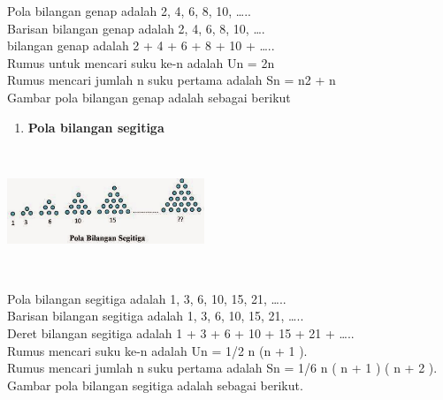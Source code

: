 \documentclass[11pt,fleqn]{book} %
\begin{document}
\noindent
\noindent Pola bilangan genap adalah 2, 4, 6, 8, 10, …..\\
\noindent Barisan bilangan genap adalah 2, 4, 6, 8, 10, ….\\
\noindent bilangan genap adalah 2 + 4 + 6 + 8 + 10 + …..\\
\noindent Rumus untuk mencari suku ke-n adalah Un = 2n\\
\noindent Rumus mencari jumlah n suku pertama adalah Sn = n2 + n\\
\noindent Gambar pola bilangan genap adalah sebagai berikut\\
\begin{enumerate}
	\item  \textbf{  Pola bilangan segitiga}
\end{enumerate}
\noindent
\begin{center}
	\noindent \includegraphics*[width=2.32in, height=1.48in, keepaspectratio=false, trim=0.00in 0.11in 0.00in 0.00in]{Pictures/23.JPG}
\end{center}
\noindent
\noindent Pola bilangan segitiga adalah 1, 3, 6, 10, 15, 21, …..\\
\noindent Barisan bilangan segitiga adalah 1, 3, 6, 10, 15, 21, …..\\
\noindent Deret bilangan segitiga adalah 1 + 3 + 6 + 10 + 15 + 21 + …..\\
\noindent Rumus mencari suku ke-n adalah Un = 1/2 n (n + 1 ).\\
\noindent Rumus mencari jumlah n suku pertama adalah Sn = 1/6 n ( n + 1 ) ( n + 2 ).\\
\noindent Gambar pola bilangan segitiga adalah sebagai berikut.\\
\end{document}
